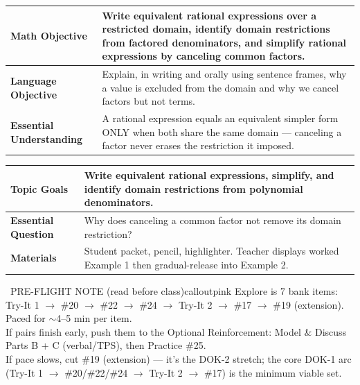 \documentclass[11pt]{article}
\begin{document}

{\small
\renewcommand{\arraystretch}{1.25}
\noindent\begin{tabular}{|p{1.8in}|p{4.8in}|}
\hline
\textbf{Math Objective} & Write equivalent rational expressions over a restricted domain, identify domain restrictions from factored denominators, and simplify rational expressions by canceling common factors. \\ \hline
\textbf{Language Objective} & Explain, in writing and orally using sentence frames, why a value is excluded from the domain and why we cancel factors but not terms. \\ \hline
\textbf{Essential Understanding} & A rational expression equals an equivalent simpler form ONLY when both share the same domain --- canceling a factor never erases the restriction it imposed. \\ \hline
\end{tabular}
}

{\small
\renewcommand{\arraystretch}{1.25}
\noindent\begin{tabular}{|p{1.8in}|p{4.8in}|}
\hline
\textbf{Topic Goals} & Write equivalent rational expressions, simplify, and identify domain restrictions from polynomial denominators. \\ \hline
\textbf{Essential Question} & Why does canceling a common factor not remove its domain restriction? \\ \hline
\textbf{Materials} & Student packet, pencil, highlighter. Teacher displays worked Example 1 then gradual-release into Example 2. \\ \hline
\end{tabular}
}

\begin{callout}{\IconPin\ PRE-FLIGHT NOTE (read before class)}{calloutpink}
Explore is 7 bank items: Try-It 1 \(\rightarrow\) \#20 \(\rightarrow\) \#22 \(\rightarrow\) \#24 \(\rightarrow\) Try-It 2 \(\rightarrow\) \#17 \(\rightarrow\) \#19 (extension). Paced for \(\sim\)4--5 min per item.\\
If pairs finish early, push them to the Optional Reinforcement: Model \& Discuss Parts B + C (verbal/TPS), then Practice \#25.\\
If pace slows, cut \#19 (extension) --- it's the DOK-2 stretch; the core DOK-1 arc (Try-It 1 \(\rightarrow\) \#20/\#22/\#24 \(\rightarrow\) Try-It 2 \(\rightarrow\) \#17) is the minimum viable set.
\end{callout}
\end{document}
